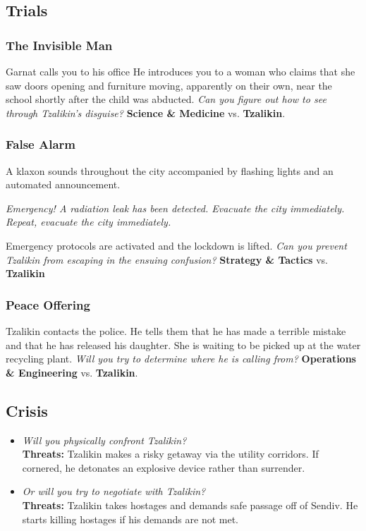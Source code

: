 \subsection*{Trials}
\subsubsection*{The Invisible Man}
Garnat calls you to his office He introduces you to a woman who claims that she saw doors opening and furniture moving, apparently on their own, near the school shortly after the child was abducted.  \textit{Can you figure out how to see through Tzalikin's disguise?}  \textbf{Science \& Medicine} vs. \textbf{Tzalikin}.

\subsubsection*{False Alarm}
A klaxon sounds throughout the city accompanied by flashing lights and an automated announcement.

\textit{Emergency! A radiation leak has been detected. Evacuate the city immediately. Repeat, evacuate the city immediately.}

Emergency protocols are activated and the lockdown is lifted. \textit{Can you prevent Tzalikin from escaping in the ensuing confusion?} \textbf{Strategy \& Tactics} vs. \textbf{Tzalikin}

\subsubsection*{Peace Offering}
Tzalikin contacts the police. He tells them that he has made a terrible mistake and that he has released his daughter. She is waiting to be picked up at the water recycling plant. \textit{Will you try to determine where he is calling from?} \textbf{Operations \& Engineering} vs. \textbf{Tzalikin}.

\subsection*{Crisis}
\begin{itemize}
	\item \textit{Will you physically confront Tzalikin?} \phantom{a} \\ \textbf{Threats:} Tzalikin makes a risky getaway via the utility corridors. If cornered, he detonates an explosive device rather than surrender.
	\item \textit{Or will you try to negotiate with Tzalikin?} \phantom{a} \\ \textbf{Threats:} Tzalikin takes hostages and demands safe passage off of Sendiv. He starts killing hostages if his demands are not met.
\end{itemize}

